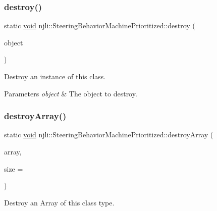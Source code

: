 \subsubsection{\texorpdfstring{destroy()}{destroy()}}
{\footnotesize\ttfamily static \mbox{\hyperlink{_thread_8h_af1e856da2e658414cb2456cb6f7ebc66}{void}} njli\+::\+Steering\+Behavior\+Machine\+Prioritized\+::destroy (\begin{DoxyParamCaption}\item[{\mbox{\hyperlink{classnjli_1_1_steering_behavior_machine_prioritized}{Steering\+Behavior\+Machine\+Prioritized}} $\ast$}]{object }\end{DoxyParamCaption})\hspace{0.3cm}{\ttfamily [static]}}

Destroy an instance of this class.


\begin{DoxyParams}{Parameters}
{\em object} & The object to destroy. \\
\hline
\end{DoxyParams}
\mbox{\label{classnjli_1_1_steering_behavior_machine_prioritized_a8d2c77293eaf78e3b039be7848113845}} 
\subsubsection{\texorpdfstring{destroy\+Array()}{destroyArray()}}
{\footnotesize\ttfamily static \mbox{\hyperlink{_thread_8h_af1e856da2e658414cb2456cb6f7ebc66}{void}} njli\+::\+Steering\+Behavior\+Machine\+Prioritized\+::destroy\+Array (\begin{DoxyParamCaption}\item[{\mbox{\hyperlink{classnjli_1_1_steering_behavior_machine_prioritized}{Steering\+Behavior\+Machine\+Prioritized}} $\ast$$\ast$}]{array,  }\item[{const \mbox{\hyperlink{_util_8h_a10e94b422ef0c20dcdec20d31a1f5049}{u32}}}]{size = {} }\end{DoxyParamCaption})\hspace{0.3cm}{\ttfamily [static]}}

Destroy an Array of this class type.


